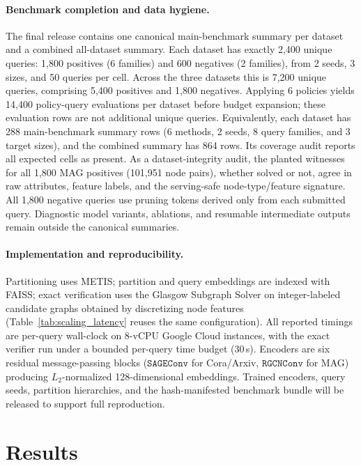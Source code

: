 \documentclass[runningheads]{llncs}
\begin{document}
\paragraph{Benchmark completion and data hygiene.}
The final release contains one canonical main-benchmark summary per dataset and a combined all-dataset summary. Each dataset has exactly 2,400 unique queries: 1,800 positives (6 families) and 600 negatives (2 families), from 2 seeds, 3 sizes, and 50 queries per cell. Across the three datasets this is 7,200 unique queries, comprising 5,400 positives and 1,800 negatives. Applying 6 policies yields 14,400 policy-query evaluations per dataset before budget expansion; these evaluation rows are not additional unique queries. Equivalently, each dataset has 288 main-benchmark summary rows (6 methods, 2 seeds, 8 query families, and 3 target sizes), and the combined summary has 864 rows. Its coverage audit reports all expected cells as present. As a dataset-integrity audit, the planted witnesses for all 1,800 MAG positives (101,951 node pairs), whether solved or not, agree in raw attributes, feature labels, and the serving-safe node-type/feature signature. All 1,800 negative queries use pruning tokens derived only from each submitted query. Diagnostic model variants, ablations, and resumable intermediate outputs remain outside the canonical summaries.

\paragraph{Implementation and reproducibility.} Partitioning uses METIS; partition and query embeddings are indexed with FAISS; exact verification uses the Glasgow Subgraph Solver on integer-labeled candidate graphs obtained by discretizing node features (Table~\ref{tab:scaling_latency} reuses the same configuration). All reported timings are per-query wall-clock on 8-vCPU Google Cloud instances, with the exact verifier run under a bounded per-query time budget (30\,s). Encoders are six residual message-passing blocks ($\mathtt{SAGEConv}$ for Cora/Arxiv, $\mathtt{RGCNConv}$ for MAG) producing $L_2$-normalized 128-dimensional embeddings. Trained encoders, query seeds, partition hierarchies, and the hash-manifested benchmark bundle will be released to support full reproduction.

\section{Results}
\end{document}
